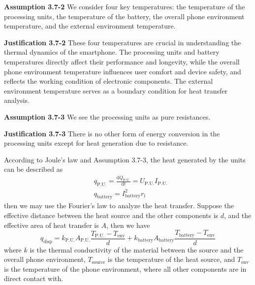 \documentclass[12pt]{article}
\begin{document}
\noindent \textbf{Assumption 3.7-2} \quad We consider four key temperatures: the temperature of the processing units, the temperature of the battery, the overall phone environment temperature, and the external environment temperature.

\noindent \textbf{Justification 3.7-2} \quad These four temperatures are crucial in understanding the thermal dynamics of the smartphone. The processing units and battery temperatures directly affect their performance and longevity, while the overall phone environment temperature influences user comfort and device safety, and reflects the working condition of electronic components. The external environment temperature serves as a boundary condition for heat transfer analysis.

\noindent \textbf{Assumption 3.7-3} \quad We see the processing units as pure resistances.

\noindent \textbf{Justification 3.7-3} \quad There is no other form of energy conversion in the processing units except for heat generation due to resistance. 
\\
\par According to Joule's law and Assumption 3.7-3, the heat generated by the units can be described as 
\begin{eqnarray}
	& q_\mathrm{P.U.}=\frac{\mathrm dQ_\mathrm{P.U.}}{\mathrm dt}=U_\mathrm{P.U.}I_\mathrm{P.U.}\\
	& q_\mathrm{battery}=I_\mathrm{battery}^2r_\mathrm{i}
\end{eqnarray}
then we may use the Fourier's law to analyze the heat transfer. Suppose the effective distance between the heat source and the other components is $d$, and the effective area of heat transfer is $A$, then we have
\begin{equation}
	q_\mathrm{disp}=k_\mathrm {P.U.}A_\mathrm{P.U.}\frac{T_\mathrm{P.U.}-T_\mathrm{env}}{d}+k_\mathrm {battery}A_\mathrm{battery}\frac{T_\mathrm{battery}-T_\mathrm{env}}{d}
\end{equation}
where $k$ is the thermal conductivity of the material between the source and the overall phone environment, $T_\mathrm{source}$ is the temperature of the heat source, and $T_\mathrm{env}$ is the temperature of the phone environment, where all other components are in direct contact with.
\end{document}

